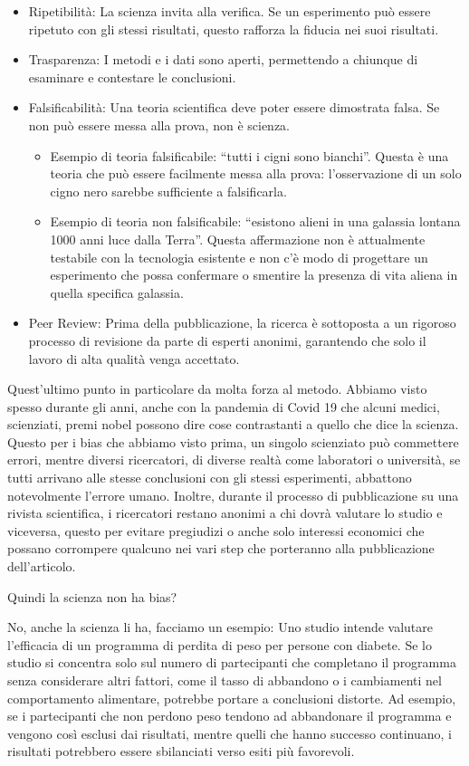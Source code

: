 \documentclass[12pt]{book} %
\begin{document}
\begin{itemize}
\item Ripetibilità: La scienza invita alla verifica. Se un esperimento può essere ripetuto con gli stessi risultati,
questo rafforza la fiducia nei suoi risultati.
\item Trasparenza: I metodi e i dati sono aperti, permettendo a chiunque di esaminare e contestare le conclusioni.
\item Falsificabilità: Una teoria scientifica deve poter essere dimostrata falsa. Se non può essere messa alla prova,
non è scienza. 

\begin{itemize}
\item Esempio di teoria falsificabile: “tutti i cigni sono bianchi”. Questa è una teoria che può essere facilmente messa
alla prova: l'osservazione di un solo cigno nero sarebbe sufficiente a falsificarla.
\item Esempio di teoria non falsificabile: “esistono alieni in una galassia lontana 1000 anni luce dalla Terra”. Questa
affermazione non è attualmente testabile con la tecnologia esistente e non c'è modo di progettare
un esperimento che possa confermare o smentire la presenza di vita aliena in quella specifica galassia.
\end{itemize}
\item Peer Review: Prima della pubblicazione, la ricerca è sottoposta a un rigoroso processo di revisione da parte di
esperti anonimi, garantendo che solo il lavoro di alta qualità venga accettato.
\end{itemize}
Quest'ultimo punto in particolare da molta forza al metodo. Abbiamo visto spesso durante gli anni,
anche con la pandemia di Covid 19 che alcuni medici, scienziati, premi nobel possono dire cose contrastanti a quello
che dice la scienza. Questo per i bias che abbiamo visto prima, un singolo scienziato può commettere errori, mentre
diversi ricercatori, di diverse realtà come laboratori o università, se tutti arrivano alle stesse conclusioni con gli
stessi esperimenti, abbattono notevolmente l'errore umano. Inoltre, durante il processo di
pubblicazione su una rivista scientifica, i ricercatori restano anonimi a chi dovrà valutare lo studio e viceversa,
questo per evitare pregiudizi o anche solo interessi economici che possano corrompere qualcuno nei vari step che
porteranno alla pubblicazione dell'articolo.

Quindi la scienza non ha bias?

No, anche la scienza li ha, facciamo un esempio: Uno studio intende valutare l'efficacia di un
programma di perdita di peso per persone con diabete. Se lo studio si concentra solo sul numero di partecipanti che
completano il programma senza considerare altri fattori, come il tasso di abbandono o i cambiamenti nel comportamento
alimentare, potrebbe portare a conclusioni distorte. Ad esempio, se i partecipanti che non perdono peso tendono ad
abbandonare il programma e vengono così esclusi dai risultati, mentre quelli che hanno successo continuano, i risultati
potrebbero essere sbilanciati verso esiti più favorevoli.
\end{document}
